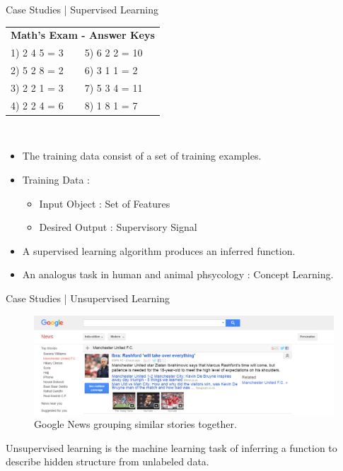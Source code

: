 \documentclass[10pt]{beamer}
\begin{document}
			\begin{frame}{Case Studies | Supervised Learning}
				\begin{center}
					\begin{tabular}{|l l|}\hline 
						\multicolumn{2}{|c|}{\textbf{Math's Exam - Answer Keys}}\\
						1) 2 4 5 = 3 & 5) 6 2 2 = 10 \\ 
						2) 5 2 8 = 2 & 6) 3 1 1 = 2  \\ 
						3) 2 2 1 = 3 & 7) 5 3 4 = 11 \\ 
						4) 2 2 4 = 6 & 8) 1 8 1 = 7  \\ \hline
					\end{tabular}\\
					\bigskip
					\begin{itemize}
						\item The training data consist of a set of training examples.
						\item Training Data :
							\begin{itemize}
								\item Input Object : Set of Features
								\item Desired Output : Supervisory Signal
							\end{itemize}
						\item A supervised learning algorithm produces an inferred function.
						\item An analogus task in human and animal phsycology : Concept Learning.
					\end{itemize}
				\end{center}
			\end{frame}
			\begin{frame}{Case Studies | Unsupervised Learning}
				\begin{center}
					\begin{figure}
					\centering
					\includegraphics[width=\linewidth]{images/unsupl-ex}
					\caption{Google News grouping similar stories together.}
					\end{figure}
					Unsupervised learning is the machine learning task of inferring a function to describe hidden structure from unlabeled data.
				\end{center}
			\end{frame}
\end{document}
